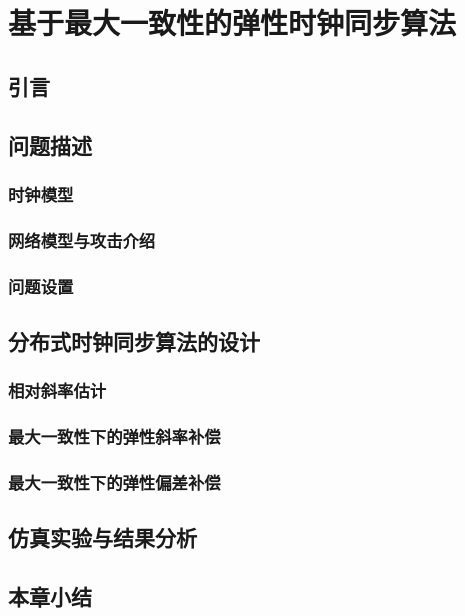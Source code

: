 \chapter{基于最大一致性的弹性时钟同步算法}

\section{引言}

\section{问题描述}

\subsection{时钟模型}

\subsection{网络模型与攻击介绍}

\subsection{问题设置}

\section{分布式时钟同步算法的设计}

\subsection{相对斜率估计}

\subsection{最大一致性下的弹性斜率补偿}

\subsection{最大一致性下的弹性偏差补偿}

\section{仿真实验与结果分析}

\section{本章小结}
